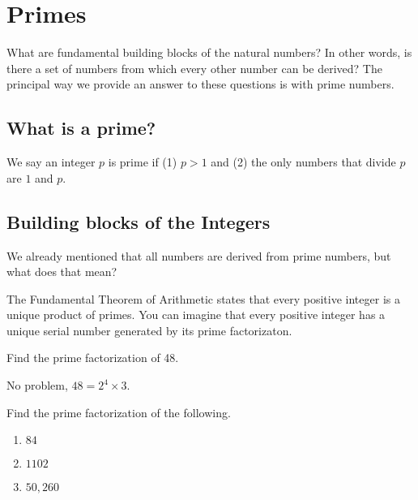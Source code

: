 
\section{Primes}

What are fundamental building blocks of the natural numbers? In other words, is there a set of numbers from which every other number can be derived? The principal way we provide an answer to these questions is with prime numbers.

\subsection{What is a prime?}
We say an integer $p$ is prime if (1) $p > 1$ and (2) the only numbers that divide $p$ are $1$ and $p$.
 
\subsection{Building blocks of the Integers}
We already mentioned that all numbers are derived from prime numbers, but what does that mean?

\noindent The Fundamental Theorem of Arithmetic states that every positive integer is a unique product of primes. You can imagine that every positive integer has a unique serial number generated by its prime factorizaton.

\begin{example}
Find the prime factorization of 48.

No problem, $48 = 2^4 \times 3$.
\end{example}

\begin{exercise}
Find the prime factorization of the following.
\end{exercise}

\begin{enumerate}
    \item $84$ 
    
    \vspace{1in}
    
    \item $1102$
    
    \vspace{1in}
    
    \item $50,260$
    
\end{enumerate}
  \vspace{1.5in}
  
